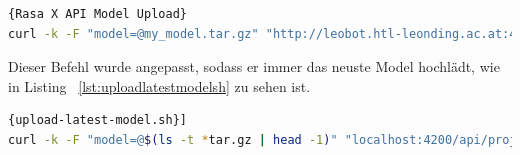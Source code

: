 \begin{lstlisting}[language=bash,label={lst:uploadlatestmodelshdefault},caption={Befehl zum Model Upload von Rasa X }]{Rasa X API Model Upload}
curl -k -F "model=@my_model.tar.gz" "http://leobot.htl-leonding.ac.at:4200/api/projects/default/models?api_token=TOKEN"
\end{lstlisting}

Dieser Befehl wurde angepasst, sodass er immer das neuste Model hochlädt, wie in Listing ~\ref{lst:uploadlatestmodelsh} zu sehen ist.

\begin{lstlisting}[language=bash,label={lst:uploadlatestmodelsh},caption={upload-latest-model.sh}]{upload-latest-model.sh}]
curl -k -F "model=@$(ls -t *tar.gz | head -1)" "localhost:4200/api/projects/default/models?api_token=TOKEN"
\end{lstlisting}

